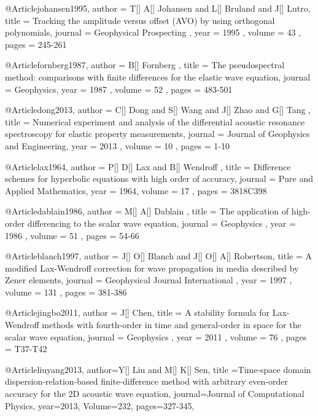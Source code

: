 @Article{johansen1995,
 author =  { T[] A[] Johansen and L[] Bruland and J[] Lutro},
 title =   {Tracking the amplitude versus offset (AVO) by using orthogonal polynomials},
 journal = { Geophysical Prospecting },
 year =    { 1995 },
 volume =  { 43 },
 pages =   { 245-261 }
}

@Article{fornberg1987,
 author =  { B[] Fornberg },
 title =   {The pseudospectral method: comparisons with finite differences for the elastic
wave equation},
 journal = { Geophysics},
 year =    { 1987 },
 volume =  { 52 },
 pages =   { 483-501 }
}

@Article{dong2013,
 author =  { C[] Dong and S[] Wang and J[] Zhao and G[] Tang },
 title =   {Numerical experiment and analysis of the differential acoustic resonance spectroscopy for elastic property measurements},
 journal = { Journal of Geophysics and Engineering},
 year =    { 2013 },
 volume =  { 10 },
 pages =   { 1-10 }
}

@Article{lax1964,
 author =  { P[] D[] Lax and B[] Wendroff },
 title =   {Difference schemes for hyperbolic equations with high order of accuracy},
 journal = { Pure and Applied Mathematics},
 year =    { 1964},
 volume =  { 17 },
 pages =   { 381\A8C398 }
}

@Article{dablain1986,
 author =  { M[] A[] Dablain },
 title =   {The application of high-order differencing to the scalar wave equation},
 journal = { Geophysics },
 year =    { 1986 },
 volume =  { 51 },
 pages =   { 54-66 }
}


@Article{blanch1997,
 author =  { J[] O[] Blanch and J[] O[] A[] Robertson},
 title =   {A modified Lax-Wendroff correction for wave propagation in media described by Zener elements},
 journal = { Geophysical Journal International },
 year =    { 1997 },
 volume =  { 131 },
 pages =   { 381-386 }
}

@Article{jingbo2011,
 author =  { J[] Chen},
 title =   {A stability formula for Lax-Wendroff methods with fourth-order in time and general-order in space for the scalar wave equation},
 journal = { Geophysics },
 year =    { 2011 },
 volume =  { 76 },
 pages =   { T37-T42 }
}

@Article{liuyang2013,
  author={Y[] Liu and M[] K[] Sen},
  title ={Time-space domain dispersion-relation-based finite-difference method with arbitrary even-order accuracy for the 2{D} acoustic wave equation},
  journal={Journal of Computational Physics},
  year=2013,
  Volume=232,
  pages={327-345},
}






